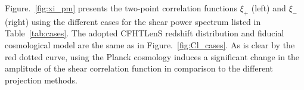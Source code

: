 \documentclass[fleqn,usenatbib]{mnras} %
\begin{document}
Figure.~\ref{fig:xi_pm} presents the two-point correlation functions
$\xi_+$ (left) and $\xi_-$ (right) using the different cases for the shear
power spectrum listed in Table~\ref{tab:cases}. The adopted CFHTLenS redshift
distribution and fiducial cosmological model are the same as in
Figure.~\ref{fig:Cl_cases}. As is clear by the red dotted curve, using the
Planck cosmology \citep{2015arXiv150201589P} induces a significant change in
the amplitude of the shear correlation function in comparison to the different projection
methods.


\begin{figure}

  \begin{center}


\end{center}
\end{figure}
\end{document}
